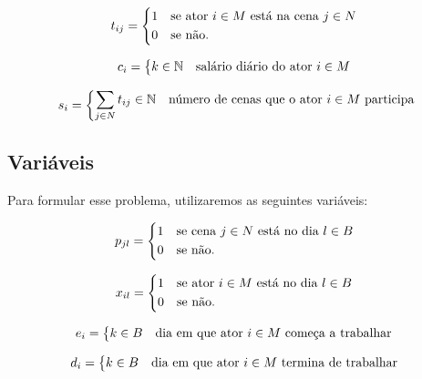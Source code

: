 \documentclass[a4paper,11pt]{article}
\begin{document}
\begin{equation}
  t_{ij} = \begin{dcases*}
              1 & se ator $i \in M$ está na cena $j \in N$ \\
              0 & se não.
           \end{dcases*}
  \label{tij}
\end{equation}

\begin{equation}
  c_{i} = \begin{dcases*} k \in \mathbb{N} & salário diário do ator $i \in M$ \end{dcases*}
\end{equation}

\begin{equation}
  s_{i} = \begin{dcases*} \sum_{j \in N} t_{ij} \in \mathbb{N} & número de cenas que o ator $i \in M$ participa\end{dcases*}
\end{equation}

\subsection{Variáveis}
Para formular esse problema, utilizaremos as seguintes variáveis:

\begin{equation}
  p_{jl} = \begin{dcases*}
              1 & se cena $j \in N$ está no dia $l \in B$ \\
              0 & se não.
           \end{dcases*}
  \label{pjl}
\end{equation}

\begin{equation}
  x_{il} = \begin{dcases*}
              1 & se ator $i \in M$ está no dia $l \in B$ \\
              0 & se não.
           \end{dcases*}
  \label{xil}
\end{equation}

\begin{equation}
  e_{i} = \begin{dcases*} k \in B & dia em que ator $i \in M$ começa a trabalhar \end{dcases*}
  \label{ei}
\end{equation}

\begin{equation}
  d_{i} = \begin{dcases*} k \in B & dia em que ator $i \in M$ termina de trabalhar \end{dcases*}
  \label{di}
\end{equation}
\end{document}

